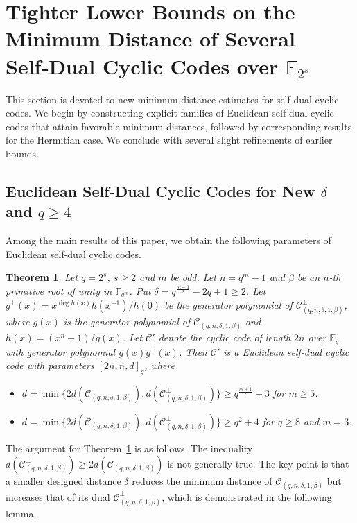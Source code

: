 \documentclass[10pt,a4paper]{amsart}
\newtheorem{theorem}{Theorem}
\begin{document}
\section{Tighter Lower Bounds on the Minimum Distance of Several Self‑Dual Cyclic Codes over $\mathbb{F}_{2^s}$ }
This section is devoted to new minimum‑distance estimates for self‑dual cyclic codes. We begin by constructing explicit families of Euclidean self‑dual cyclic codes that attain favorable minimum distances, followed by corresponding results for the Hermitian case. We conclude with several slight refinements of earlier bounds.


\label{3}
\subsection{Euclidean Self-Dual Cyclic Codes for New $\delta$ and $q\ge 4$}

Among the main results of this paper, we obtain the following parameters of Euclidean self-dual cyclic codes.

\begin{theorem}
    \label{4 small delta self-dual cyclic}
    Let $q=2^s$, $s\ge2$ and $m$ be odd. Let $n=q^m-1$ and $\beta$ be an $n$-th primitive root of unity in $\mathbb{F}_{q^m}$. Put $\delta=q^{\frac{m+1}{2}}-2q+1\ge2$. Let $g^\perp(x)=x^{\deg h(x)}h(x^{-1})/h(0)$ be the generator polynomial of $\mathcal{C}_{(q,n,\delta,1,\beta)}^\perp$, where $g(x)$ is the generator polynomial of $\mathcal{C}_{(q,n,\delta,1,\beta)}$ and $h(x)=(x^n-1)/g(x)$. Let $\mathcal{C}'$ denote the cyclic code of length $2n$ over $\mathbb{F}_q$ with generator polynomial $g(x)g^\perp(x)$. Then $\mathcal{C}'$ is a Euclidean self-dual cyclic code with parameters $[2n,n,d]_q$, where
    \begin{itemize}
        \item $d=\min\{2d(\mathcal{C}_{(q,n,\delta,1,\beta)}),d(\mathcal{C}_{(q,n,\delta,1,\beta)}^\perp)\}\ge q^\frac{m+1}{2}+3$ for $m\ge5$.
        \item $d=\min\{2d(\mathcal{C}_{(q,n,\delta,1,\beta)}),d(\mathcal{C}_{(q,n,\delta,1,\beta)}^\perp)\}\ge q^2+4$ for $q\ge8$ and $m=3$.
    \end{itemize}
\end{theorem}

The argument for Theorem~\ref{4 small delta self-dual cyclic} is as follows. The inequality
$d(\mathcal{C}^{\perp}_{(q,n,\delta,1,\beta)}) \ge 2d(\mathcal{C}_{(q,n,\delta,1,\beta)})$
is not generally true. The key point is that a smaller designed distance $\delta$ reduces the minimum distance of $\mathcal{C}_{(q,n,\delta,1,\beta)}$ but increases that of its dual $\mathcal{C}^{\perp}_{(q,n,\delta,1,\beta)}$, which is demonstrated in the following lemma.
\end{document}
